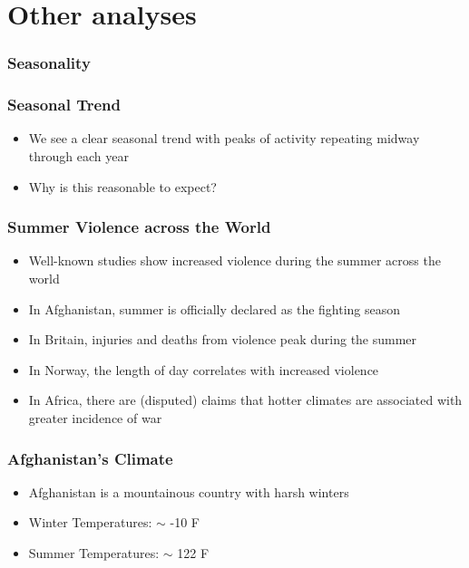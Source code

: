 \documentclass[xcolor=dvipsnames, 9pt]{beamer}
\begin{document}

\section{Other analyses} %
\label{sec:other_analyses}

\begin{frame}[fragile]
  \frametitle{Seasonality}
  \begin{center}
  \end{center}
\end{frame}

\begin{frame}[fragile]
  \frametitle{Seasonal Trend}
  \begin{itemize}
    \item{We see a clear seasonal trend with peaks of activity repeating midway through each year}
    \item{Why is this reasonable to expect?}
  \end{itemize}
\end{frame}

\begin{frame}[fragile]
  \frametitle{Summer Violence across the World}
  \begin{itemize}
    \item{Well-known studies show increased violence during the summer across the world}
    \item{In Afghanistan, summer is officially declared as the fighting season}
    \item{In Britain, injuries and deaths from violence peak during the summer}
    \item{In Norway, the length of day correlates with increased violence}
    \item{In Africa, there are (disputed) claims that hotter climates are associated with greater incidence of war}
  \end{itemize}
\end{frame}

\begin{frame}[fragile]
  \frametitle{Afghanistan's Climate}
  \begin{itemize}
    \item{Afghanistan is a mountainous country with harsh winters}
    \item{Winter Temperatures: $\sim$ -10 F}
    \item{Summer Temperatures: $\sim$ 122 F}
  \end{itemize}
\end{frame}
\end{document}
